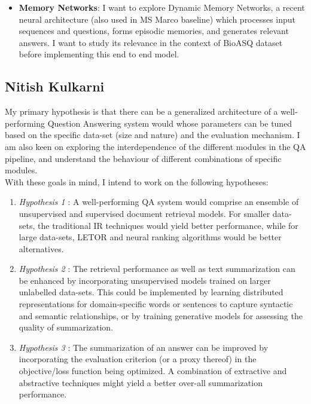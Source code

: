 \documentclass{article}
\begin{document}
\begin{itemize}
    \item \textbf{Memory Networks}: I want to explore Dynamic Memory Networks, a recent neural architecture (also used in MS Marco baseline) which processes input sequences and questions, forms episodic memories, and generates relevant answers. I want to study its relevance in the context of BioASQ dataset before implementing this end to end model. 
\end{itemize}

\pagebreak

\subsection{Nitish Kulkarni}

My primary hypothesis is that there can be a generalized architecture of a well-performing Question Answering system would whose parameters can be tuned based on the specific data-set (size and nature) and the evaluation mechanism. I am also keen on exploring the interdependence of the different modules in the QA pipeline, and understand the behaviour of different combinations of specific modules. \\

With these goals in mind, I intend to work on the following hypotheses:

\begin{enumerate}

    \item[] \textit{Hypothesis 1} : A well-performing QA system would comprise an ensemble of unsupervised and supervised document retrieval models. For smaller data-sets, the traditional IR techniques would yield better performance, while for large data-sets, LETOR and neural ranking algorithms would be better alternatives.
    
    \item[] \textit{Hypothesis 2} : The retrieval performance as well as text summarization can be enhanced by incorporating unsupervised models trained on larger unlabelled data-sets. This could be implemented by learning distributed representations for domain-specific words or sentences to capture syntactic and semantic relationships, or by training generative models for assessing the quality of summarization.
    
    \item[] \textit{Hypothesis 3} : The summarization of an answer can be improved by incorporating the evaluation criterion (or a proxy thereof) in the objective/loss function being optimized. A combination of extractive and abstractive techniques might yield a better over-all summarization performance.
    
\end{enumerate}
\end{document}
